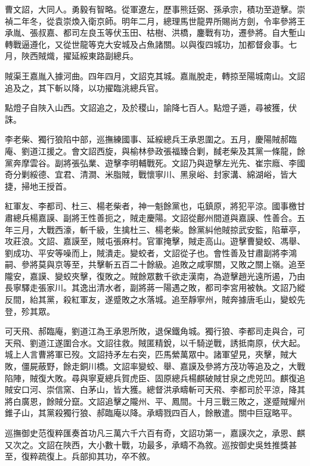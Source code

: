 
\begin{pinyinscope}
曹文詔，大同人。勇毅有智略。從軍遼左，歷事熊廷弼、孫承宗，積功至遊擊。崇禎二年冬，從袁崇煥入衛京師。明年二月，總理馬世龍畀所賜尚方劍，令率參將王承胤、張叔嘉、都司左良玉等伏玉田、枯樹、洪橋，鏖戰有功，遷參將。自大塹山轉戰逼遵化，又從世龍等克大安城及占魚諸關。以與復四城功，加都督僉事。七月，陜西賊熾，擢延綏東路副總兵。

賊渠王嘉胤入據河曲。四年四月，文詔克其城。嘉胤脫走，轉掠至陽城南山。文詔追及之，其下斬以降，以功擢臨洮總兵官。

點燈子自陜入山西。文詔追之，及於稷山，諭降七百人。點燈子遁，尋被獲，伏誅。

李老柴、獨行狼陷中部，巡撫練國事、延綏總兵王承恩圍之。五月，慶陽賊郝臨庵、劉道江援之。會文詔西旋，與榆林參政張福臻合剿，馘老柴及其黨一條龍，餘黨奔摩雲谷。副將張弘業、遊擊李明輔戰死。文詔乃與遊擊左光先、崔宗廕、李國奇分剿綏德、宜君、清澗、米脂賊，戰懷寧川、黑泉峪、封家溝、綿湖峪，皆大捷，掃地王授首。

紅軍友、李都司、杜三、楊老柴者，神一魁餘黨也，屯鎮原，將犯平涼。國事檄甘肅總兵楊嘉謨、副將王性善扼之，賊走慶陽。文詔從鄜州間道與嘉謨、性善合。五年三月，大戰西濠，斬千級，生擒杜三、楊老柴。餘黨糾他賊掠武安監，陷華亭，攻莊浪。文詔、嘉謨至，賊屯張麻村。官軍掩擊，賊走高山。遊擊曹變蛟、馮舉、劉成功、平安等噪而上，賊潰走。變蛟者，文詔從子也。會性善及甘肅副將李鴻嗣、參將莫與京等至，共擊斬五百二十餘級。追敗之咸寧關，又敗之關上嶺。追至隴安，嘉謨、變蛟夾擊，復敗之。賊餘眾數千欲走漢南，為遊擊趙光遠所遏，乃由長寧驛走張家川。其逸出清水者，副將蔣一陽遇之敗，都司李宮用被執。文詔乃縱反間，紿其黨，殺紅軍友，遂蹙敗之水落城。追至靜寧州，賊奔據唐毛山，變蛟先登，殄其眾。

可天飛、郝臨庵，劉道江為王承恩所敗，退保鐵角城。獨行狼、李都司走與合，可天飛、劉道江遂圍合水。文詔往救。賊匿精銳，以千騎逆戰，誘抵南原，伏大起。城上人言曹將軍已歿。文詔持矛左右突，匹馬縈萬眾中。諸軍望見，夾擊，賊大敗，僵屍蔽野，餘走銅川橋。文詔率變蛟、舉、嘉謨及參將方茂功等追及之，大戰陷陣，賊復大敗。尋與寧夏總兵賀虎臣、固原總兵楊麒破賊甘泉之虎兕凹。麒復追賊安口河、崇信窯、白茅山，皆大獲。總督洪承疇斬可天飛、李都司於平涼，降其將白廣恩，餘賊分竄。文詔追擊之隴州、平、鳳間。十月三戰三敗之，遂蹙賊耀州錐子山，其黨殺獨行狼、郝臨庵以降。承疇戮四百人，餘散遣。關中巨寇略平。

巡撫御史范復粹匯奏首功凡三萬六千六百有奇，文詔功第一，嘉謨次之，承恩、麒又次之。文詔在陜西，大小數十戰，功最多，承疇不為敘。巡按御史吳甡推獎甚至，復粹疏復上。兵部抑其功，卒不敘。


\end{pinyinscope}
